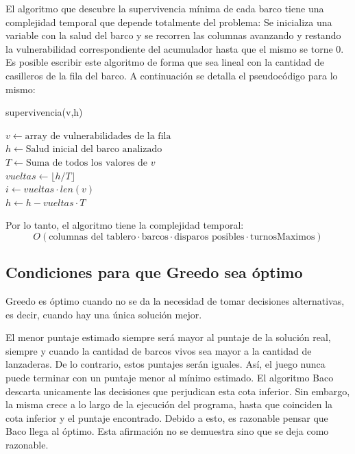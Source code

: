 \documentclass{article}
\begin{document}
El algoritmo que descubre la supervivencia mínima de cada barco tiene una complejidad temporal que depende totalmente del problema: Se inicializa una variable con la salud del barco y se recorren las columnas avanzando y restando la vulnerabilidad correspondiente del acumulador hasta que el mismo se torne 0. Es posible escribir este algoritmo de forma que sea lineal con la cantidad de casilleros de la fila del barco. A continuación se detalla el pseudocódigo para lo mismo:

\begin{algorithm}
\caption{supervivencia(v,h)}
    $v \leftarrow \text{array de vulnerabilidades de la fila}$ \\
    $h \leftarrow \text{Salud inicial del barco analizado}$ \\
    
    
    $T \leftarrow \text{Suma de todos los valores de } v$ \\
    $vueltas \leftarrow \lfloor h / T \rfloor $ \\
    $i \leftarrow vueltas \cdot len(v)$ \\
    $h \leftarrow h-vueltas \cdot T$ \\
    
    
    
\end{algorithm}

Por lo tanto, el algoritmo tiene la complejidad temporal:
$$O(\text{columnas del tablero} \cdot \text{barcos}  \cdot \text{disparos posibles} \cdot \text{turnosMaximos})$$


\subsection{Condiciones para que Greedo sea óptimo}
Greedo es óptimo cuando no se da la necesidad de tomar decisiones alternativas, es decir, cuando hay una única solución mejor. 

El menor puntaje estimado siempre será mayor al puntaje de la solución real, siempre y cuando la cantidad de barcos vivos sea mayor a la cantidad de lanzaderas. De lo contrario, estos puntajes serán iguales. Así, el juego nunca puede terminar con un puntaje menor al mínimo estimado. El algoritmo Baco descarta unicamente las decisiones que perjudican esta cota inferior. Sin embargo, la misma crece a lo largo de la ejecución del programa, hasta que coinciden la cota inferior y el puntaje encontrado. Debido a esto, es razonable pensar que Baco llega al óptimo. Esta afirmación no se demuestra sino que se deja como razonable.
\end{document}
